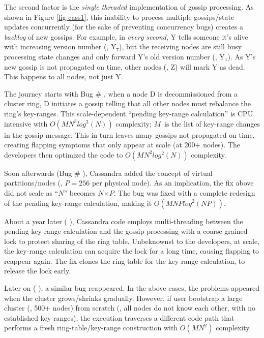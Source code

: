 The second factor is the {\em single threaded} implementation of gossip
processing. As shown in Figure \ref{fig-cass1},  this inability to process
multiple gossips/state updates concurrently (for the sake of preventing
concurrency bugs) creates a {\em backlog} of new gossips.  For example, in {\em
every second}, Y tells someone it's alive with increasing version number (\eg,
Y$_7$), but the receiving nodes are still busy processing state changes and
only forward Y's old version number (\eg, Y$_1$).  As Y's new gossip is not
propagated on time,  other nodes (\eg, Z) will mark Y as dead.  This happens to
all nodes, not just Y.

The journey starts with Bug \# \cite{CA-Two}, when a node D is
decommissioned from a cluster ring, D initiates a gossip telling that all other
nodes must rebalance the ring's key-ranges.  This scale-dependent ``pending
key-range calculation'' is CPU intensive with
%
$O(MN^3log^3(N))$  %
%
complexity; $M$~is the list of key-range changes in the gossip message.  This
in turn leaves many gossips not propagated on time, creating flapping symptoms
that only appear at scale (at 200+ nodes). The developers
then optimized the code to
%
$O(MN^2log^2(N))$ complexity.



Soon afterwards (Bug \# \cite{CA-Tri}), Cassandra added the concept of
virtual partitions/nodes (\eg, $P$$=$$256$ per physical node).  As an
implication, the fix above did not scale as ``$N$'' becomes $N$$\times$$P$.
%
The bug was fixed with a complete redesign of the pending key-range
calculation, making it
$O(MNPlog^2(NP))$.

About a year later ( \cite{CA-Four}), Cassandra code employs
multi-threading between the pending key-range calculation and the gossip
processing with a coarse-grained lock to protect sharing of the ring
table.  Unbeknownst to the developers, at scale, the key-range calculation
can acquire the lock for a long time, causing flapping to reappear again.
The fix clones the ring table for the key-range calculation, to release the
lock early.



Later on ( \cite{CA-One}), a similar bug reappeared.  In the above
cases, the problems appeared when the cluster grows/shrinks gradually.
However, if user bootstrap a large cluster (\eg, 500+ nodes) from
scratch (\ie, all nodes do not know each other, with no established
key ranges),
%
the execution traverses a different code path that
performs a fresh ring-table/key-range construction with
$O(MN^2)$ %
complexity.

